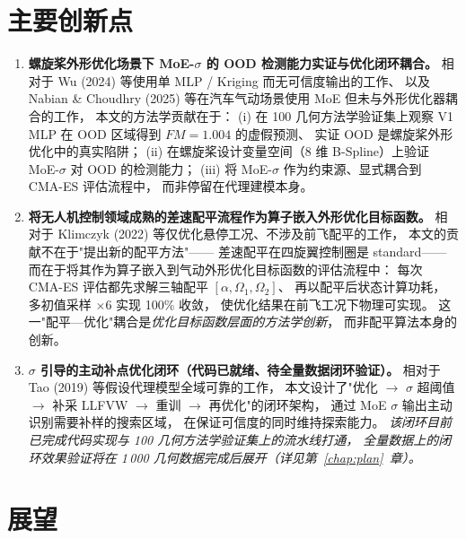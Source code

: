 \section*{主要创新点}

\begin{enumerate}
  \item \textbf{螺旋桨外形优化场景下 MoE-$\sigma$ 的 OOD 检测能力实证与优化闭环耦合。}
        相对于 Wu (2024)\cite{Wu2024} 等使用单 MLP / Kriging 而无可信度输出的工作、
        以及 Nabian \& Choudhry (2025)\cite{Nabian2025moe} 等在汽车气动场景使用 MoE 但未与外形优化器耦合的工作，
        本文的方法学贡献在于：
        (i) 在 100 几何方法学验证集上观察 V1 MLP 在 OOD 区域得到 $FM=1.004$ 的虚假预测、
        实证 OOD 是螺旋桨外形优化中的真实陷阱；
        (ii) 在螺旋桨设计变量空间（8 维 B-Spline）上验证 MoE-$\sigma$ 对 OOD 的检测能力；
        (iii) 将 MoE-$\sigma$ 作为约束源、显式耦合到 CMA-ES 评估流程中，
        而非停留在代理建模本身。

  \item \textbf{将无人机控制领域成熟的差速配平流程作为算子嵌入外形优化目标函数。}
        相对于 Klimczyk (2022)\cite{Klimczyk2022} 等仅优化悬停工况、不涉及前飞配平的工作，
        本文的贡献不在于"提出新的配平方法"——
        差速配平在四旋翼控制圈是 standard——
        而在于将其作为算子嵌入到气动外形优化目标函数的评估流程中：
        每次 CMA-ES 评估都先求解三轴配平 $[\alpha, \Omega_1, \Omega_2]$、
        再以配平后状态计算功耗，
        多初值采样 $\times 6$ 实现 100\% 收敛，
        使优化结果在前飞工况下物理可实现。
        这一"配平—优化"耦合是\emph{优化目标函数层面的方法学创新}，
        而非配平算法本身的创新。

  \item \textbf{$\sigma$ 引导的主动补点优化闭环（代码已就绪、待全量数据闭环验证）。}
        相对于 Tao (2019)\cite{Tao2019} 等假设代理模型全域可靠的工作，
        本文设计了"优化 $\rightarrow$ $\sigma$ 超阈值 $\rightarrow$ 补采 LLFVW $\rightarrow$ 重训 $\rightarrow$ 再优化"的闭环架构，
        通过 MoE $\sigma$ 输出主动识别需要补样的搜索区域，
        在保证可信度的同时维持探索能力。
        \emph{该闭环目前已完成代码实现与 100 几何方法学验证集上的流水线打通，
        全量数据上的闭环效果验证将在 1\,000 几何数据完成后展开（详见第~\ref{chap:plan}~章）。}
\end{enumerate}

\section*{展望}

